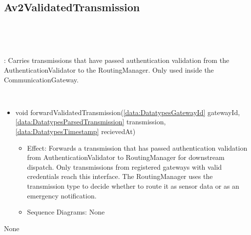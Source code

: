   \subsection{Av2ValidatedTransmission}\label{int:InterfacesAv2ValidatedTransmission}
    \begin{description}
      \item[Provided by:] \iconcomponent{}~
      \item[Required by:] \iconcomponent{}~ 
           \item[Description]: Carries transmissions that have passed authentication validation from the AuthenticationValidator to the RoutingManager. Only used inside the CommunicationGateway.
      \item[Operations:] ~
    \begin{itemize}[noitemsep,nolistsep,leftmargin=-.25cm]
      \item \textsf{void forwardValidatedTransmission(\ref{data:DatatypesGatewayId} gatewayId, \ref{data:DatatypesParsedTransmission} transmission, \ref{data:DatatypesTimestamp} recievedAt)}
        \begin{itemize}[noitemsep,nolistsep]
           \item Effect: Forwards a transmission that has passed authentication validation from AuthenticationValidator to RoutingManager for downstream dispatch. Only transmissions from registered gateways with valid credentials reach this interface. The RoutingManager uses the transmission type to decide whether to route it as sensor data or as an emergency notification. 
           \item Sequence Diagrams: None
        \end{itemize}
    \end{itemize}
      \item[Diagrams:] None
    \end{description}

